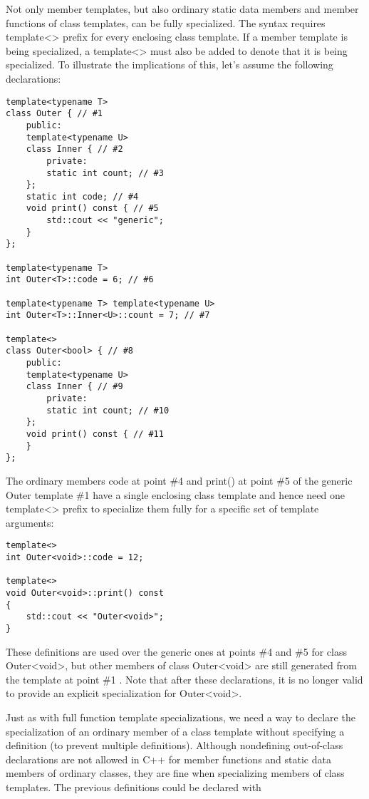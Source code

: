 
Not only member templates, but also ordinary static data members and member functions of class templates, can be fully specialized. The syntax requires template<> prefix for every enclosing class template. If a member template is being specialized, a template<> must also be added to denote that it is being specialized. To illustrate the implications of this, let’s assume the following declarations:

\begin{lstlisting}[style=styleCXX]
template<typename T>
class Outer { // #1
	public:
	template<typename U>
	class Inner { // #2
		private:
		static int count; // #3
	};
	static int code; // #4
	void print() const { // #5
		std::cout << "generic";
	}
};

template<typename T>
int Outer<T>::code = 6; // #6

template<typename T> template<typename U>
int Outer<T>::Inner<U>::count = 7; // #7

template<>
class Outer<bool> { // #8
	public:
	template<typename U>
	class Inner { // #9
		private:
		static int count; // #10
	};
	void print() const { // #11
	}
};
\end{lstlisting}

The ordinary members code at point \#4 and print() at point \#5 of the generic Outer template \#1 have a single enclosing class template and hence need one template<> prefix to specialize them fully for a specific set of template arguments:

\begin{lstlisting}[style=styleCXX]
template<>
int Outer<void>::code = 12;

template<>
void Outer<void>::print() const
{
	std::cout << "Outer<void>";
}
\end{lstlisting}

These definitions are used over the generic ones at points \#4 and \#5 for class Outer<void>, but other members of class Outer<void> are still generated from the template at point \#1 . Note that after these declarations, it is no longer valid to provide an explicit specialization for Outer<void>.

Just as with full function template specializations, we need a way to declare the specialization of an ordinary member of a class template without specifying a definition (to prevent multiple definitions). Although nondefining out-of-class declarations are not allowed in C++ for member functions and static data members of ordinary classes, they are fine when specializing members of class templates. The previous definitions could be declared with

